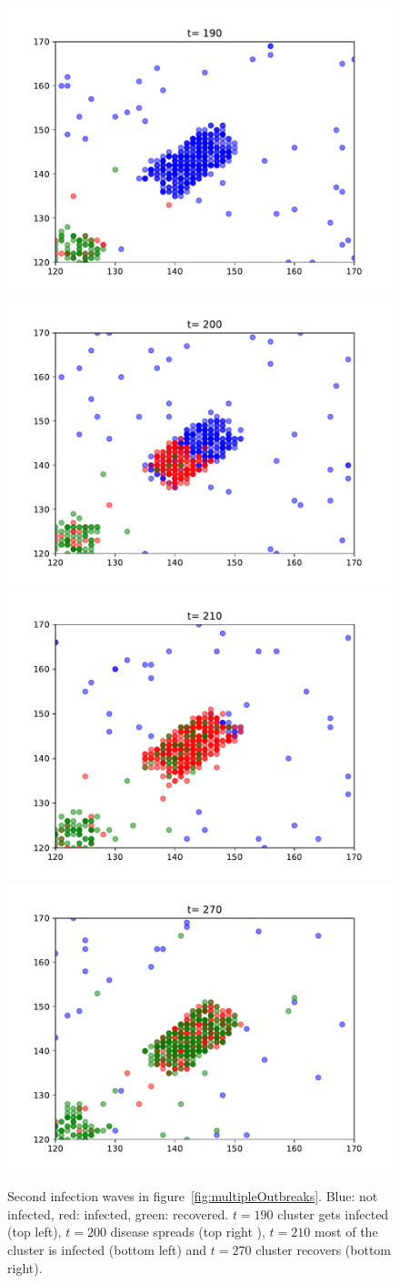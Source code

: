\begin{figure}[H]
    \includegraphics[width=.24\textwidth]{img/cluster190.pdf}\hfill
    \includegraphics[width=.24\textwidth]{img/cluster200.pdf}\hfill
    \\[\smallskipamount]
    \includegraphics[width=.24\textwidth]{img/cluster210.pdf}\hfill
    \includegraphics[width=.24\textwidth]{img/cluster270.pdf}\hfill
    \caption{Second infection waves in figure~\ref{fig:multipleOutbreaks}. Blue: not infected, red: infected, green: recovered. $t = 190$ cluster gets infected (top left), $t = 200$ disease spreads (top right ), $t = 210$ most of the cluster is infected (bottom left) and $t = 270$ cluster recovers (bottom right).}%
    \label{fig:foobar}
    
\end{figure}
